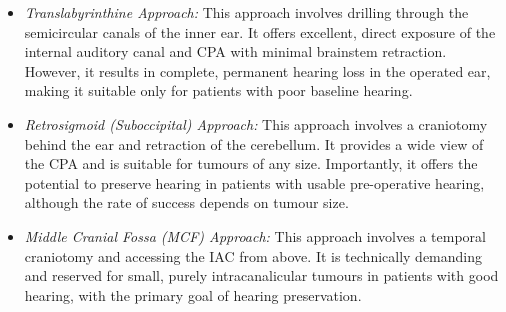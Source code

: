 \begin{itemize}
    \begin{itemize}
        \item \textit{Translabyrinthine Approach:} This approach involves drilling through the semicircular canals of the inner ear. It offers excellent, direct exposure of the internal auditory canal and CPA with minimal brainstem retraction. However, it results in complete, permanent hearing loss in the operated ear, making it suitable only for patients with poor baseline hearing.
        \item \textit{Retrosigmoid (Suboccipital) Approach:} This approach involves a craniotomy behind the ear and retraction of the cerebellum. It provides a wide view of the CPA and is suitable for tumours of any size. Importantly, it offers the potential to preserve hearing in patients with usable pre-operative hearing, although the rate of success depends on tumour size.
        \item \textit{Middle Cranial Fossa (MCF) Approach:} This approach involves a temporal craniotomy and accessing the IAC from above. It is technically demanding and reserved for small, purely intracanalicular tumours in patients with good hearing, with the primary goal of hearing preservation.
    \end{itemize}
\end{itemize}

